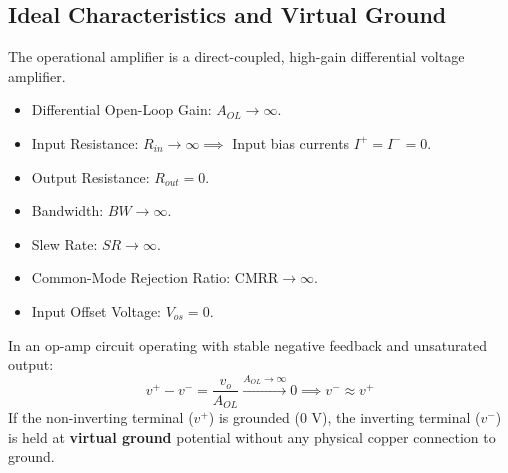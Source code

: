 \subsection{Ideal Characteristics and Virtual Ground}
The operational amplifier is a direct-coupled, high-gain differential voltage amplifier.
\begin{definition}
\begin{itemize}
    \item Differential Open-Loop Gain: $A_{OL} \to \infty$.
    \item Input Resistance: $R_{in} \to \infty \implies$ Input bias currents $I^+ = I^- = 0$.
    \item Output Resistance: $R_{out} = 0$.
    \item Bandwidth: $BW \to \infty$.
    \item Slew Rate: $SR \to \infty$.
    \item Common-Mode Rejection Ratio: $\text{CMRR} \to \infty$.
    \item Input Offset Voltage: $V_{os} = 0$.
\end{itemize}
\end{definition}

\begin{theorem}
In an op-amp circuit operating with stable negative feedback and unsaturated output:
\begin{equation}
v^+ - v^- = \frac{v_o}{A_{OL}} \xrightarrow{A_{OL} \to \infty} 0 \implies v^- \approx v^+
\end{equation}
If the non-inverting terminal ($v^+$) is grounded ($0\text{ V}$), the inverting terminal ($v^-$) is held at \textbf{virtual ground} potential without any physical copper connection to ground.
\end{theorem}

